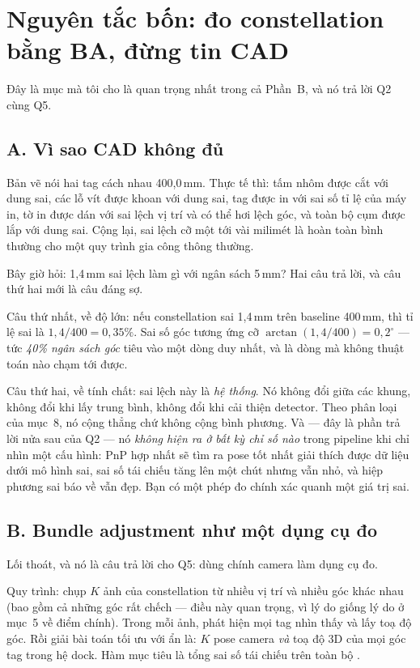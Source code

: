 \documentclass[../../marker.tex]{subfiles}
\begin{document}
\section{Nguyên tắc bốn: đo constellation bằng BA, đừng tin CAD}

Đây là mục mà tôi cho là quan trọng nhất trong cả Phần~B, và nó trả lời Q2 cùng Q5.

\subsection{A. Vì sao CAD không đủ}

Bản vẽ nói hai tag cách nhau 400,0\,mm. Thực tế thì: tấm nhôm được cắt với dung sai, các lỗ vít được khoan với dung sai, tag được in với sai số tỉ lệ của máy in, tờ in được dán với sai lệch vị trí và có thể hơi lệch góc, và toàn bộ cụm được lắp với dung sai. Cộng lại, sai lệch cỡ một tới vài milimét là hoàn toàn bình thường cho một quy trình gia công thông thường.

Bây giờ hỏi: 1,4\,mm sai lệch làm gì với ngân sách 5\,mm? Hai câu trả lời, và câu thứ hai mới là câu đáng sợ.

Câu thứ nhất, về độ lớn: nếu constellation sai 1,4\,mm trên baseline 400\,mm, thì tỉ lệ sai là \(1{,}4/400 = 0{,}35\%\). Sai số góc tương ứng cỡ \(\arctan(1{,}4/400) = 0{,}2^\circ\) --- tức \emph{40\% ngân sách góc} tiêu vào một dòng duy nhất, và là dòng mà không thuật toán nào chạm tới được.

Câu thứ hai, về tính chất: sai lệch này là \emph{hệ thống}. Nó không đổi giữa các khung, không đổi khi lấy trung bình, không đổi khi cải thiện detector. Theo phân loại của  mục~8, nó cộng thẳng chứ không cộng bình phương. Và --- đây là phần trả lời nửa sau của Q2 --- nó \emph{không hiện ra ở bất kỳ chỉ số nào} trong pipeline khi chỉ nhìn một cấu hình: PnP hợp nhất sẽ tìm ra pose tốt nhất giải thích được dữ liệu dưới mô hình sai, sai số tái chiếu tăng lên một chút nhưng vẫn nhỏ, và hiệp phương sai báo về vẫn đẹp. Bạn có một phép đo chính xác quanh một giá trị sai.

\subsection{B. Bundle adjustment như một dụng cụ đo}

Lối thoát, và nó là câu trả lời cho Q5: dùng chính camera làm dụng cụ đo.

Quy trình: chụp \(K\) ảnh của constellation từ nhiều vị trí và nhiều góc khác nhau (bao gồm cả những góc rất chếch --- điều này quan trọng, vì lý do giống lý do ở  mục~5 về điểm chính). Trong mỗi ảnh, phát hiện mọi tag nhìn thấy và lấy toạ độ góc. Rồi giải bài toán tối ưu với ẩn là: \(K\) pose camera \emph{và} toạ độ 3D của mọi góc tag trong hệ dock. Hàm mục tiêu là tổng sai số tái chiếu trên toàn bộ \cite{triggs2000bundle}.
\end{document}
